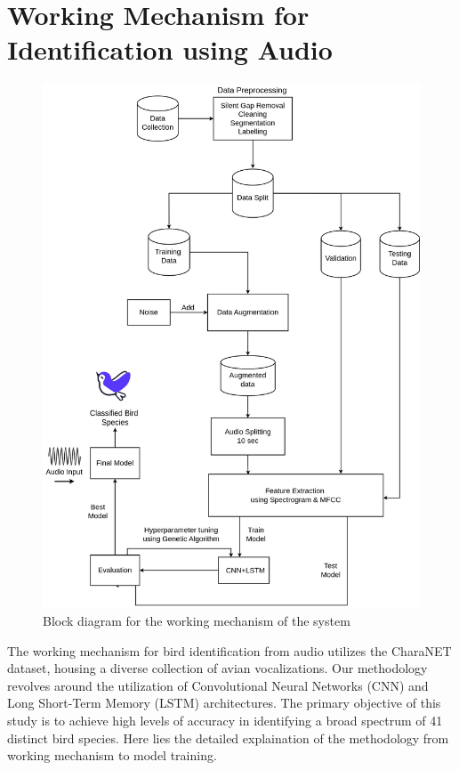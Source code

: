 \section{Working Mechanism for Identification using Audio}
\begin{figure}[h!]
    \centering
    \includegraphics[scale=0.33]{images/Methodology.png}
    \caption{Block diagram for the working mechanism of the
        system}%
\end{figure}
\newpage
The working mechanism for bird identification from audio utilizes the CharaNET
dataset,
housing a diverse collection of avian vocalizations. Our methodology revolves
around the
utilization of Convolutional Neural Networks (CNN) and Long Short-Term Memory
(LSTM) architectures.
The primary objective of this study is to achieve high levels of accuracy in
identifying a
broad spectrum of 41 distinct bird species. Here lies the detailed explaination
of the methodology
from working mechanism to model training.

